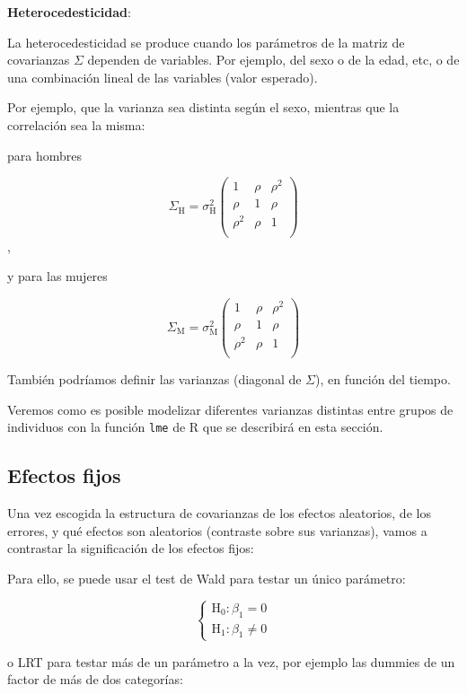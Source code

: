 \documentclass[
]{book}
\begin{document}
\textbf{Heterocedesticidad}:

La heterocedesticidad se produce cuando los parámetros de la matriz de covarianzas \(\Sigma\) dependen de variables. Por ejemplo, del sexo o de la edad, etc, o de una combinación lineal de las variables (valor esperado).

Por ejemplo, que la varianza sea distinta según el sexo, mientras que la correlación sea la misma:

para hombres

\[ 
\Sigma_{\text{H}} = \sigma_{\text{H}}^2
\begin{pmatrix}
1 &  \rho & \rho^2 \\
\rho & 1 & \rho \\
\rho^2 & \rho & 1 \\
\end{pmatrix}
\],

y para las mujeres

\[ 
\Sigma_{\text{M}} = \sigma_{\text{M}}^2
\begin{pmatrix}
1 &  \rho & \rho^2 \\
\rho & 1 & \rho \\
\rho^2 & \rho & 1 \\
\end{pmatrix}
\]

También podríamos definir las varianzas (diagonal de \(\Sigma\)), en función del tiempo.

Veremos como es posible modelizar diferentes varianzas distintas entre grupos de individuos con la función \texttt{lme} de R que se describirá en esta sección.

\hypertarget{efectos-fijos}{%
\subsection{Efectos fijos}\label{efectos-fijos}}

Una vez escogida la estructura de covarianzas de los efectos aleatorios, de los errores, y qué efectos son aleatorios (contraste sobre sus varianzas), vamos a contrastar la significación de los efectos fijos:

Para ello, se puede usar el test de Wald para testar un único parámetro:

\[
\left\{\begin{array}{l}
\text{H}_0: \beta_1 = 0\\
\text{H}_1: \beta_1 \neq 0
\end{array}\right.
\]

o LRT para testar más de un parámetro a la vez, por ejemplo las dummies de un factor de más de dos categorías:
\end{document}
